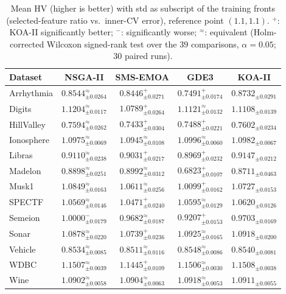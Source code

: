 
\begin{table}[!htbp]
\caption{Mean HV (higher is better) with std as subscript of the training fronts (selected-feature ratio vs.\ inner-CV error), reference point $(1.1,1.1)$. $^+$: KOA-II significantly better; $^-$: significantly worse; $^\approx$: equivalent (Holm-corrected Wilcoxon signed-rank test over the $39$ comparisons, $\alpha=0.05$; 30 paired runs).}
\label{tab:fs_hv_train}
\centering
\small
\setlength{\tabcolsep}{4pt}
\renewcommand{\arraystretch}{1.25}
\begin{tabular}{@{}lcccc@{}}
\hline
\textbf{Dataset} & \textbf{NSGA-II} & \textbf{SMS-EMOA} & \textbf{GDE3} & \textbf{KOA-II} \\
\hline
Arrhythmia & $0.8544_{\pm0.0264}^{\approx}$ & $0.8446_{\pm0.0271}^{+}$ & $0.7491_{\pm0.0174}^{+}$ & $\mathbf{0.8732}_{\pm0.0291}$ \\
Digits & $\mathbf{1.1204}_{\pm0.0117}^{\approx}$ & $1.0789_{\pm0.0264}^{+}$ & $1.1121_{\pm0.0132}^{\approx}$ & $1.1108_{\pm0.0139}$ \\
HillValley & $0.7594_{\pm0.0262}^{\approx}$ & $0.7433_{\pm0.0304}^{+}$ & $0.7488_{\pm0.0221}^{+}$ & $\mathbf{0.7602}_{\pm0.0234}$ \\
Ionosphere & $1.0975_{\pm0.0069}^{\approx}$ & $1.0945_{\pm0.0108}^{\approx}$ & $\mathbf{1.0996}_{\pm0.0060}^{\approx}$ & $1.0982_{\pm0.0067}$ \\
Libras & $0.9110_{\pm0.0238}^{\approx}$ & $0.9031_{\pm0.0217}^{+}$ & $0.8969_{\pm0.0232}^{+}$ & $\mathbf{0.9147}_{\pm0.0212}$ \\
Madelon & $0.8898_{\pm0.0251}^{\approx}$ & $\mathbf{0.8992}_{\pm0.0312}^{\approx}$ & $0.6823_{\pm0.0107}^{+}$ & $0.8711_{\pm0.0463}$ \\
Musk1 & $\mathbf{1.0849}_{\pm0.0163}^{\approx}$ & $1.0611_{\pm0.0256}^{\approx}$ & $1.0099_{\pm0.0162}^{+}$ & $1.0727_{\pm0.0153}$ \\
SPECTF & $1.0569_{\pm0.0146}^{\approx}$ & $1.0471_{\pm0.0240}^{+}$ & $1.0595_{\pm0.0129}^{\approx}$ & $\mathbf{1.0620}_{\pm0.0126}$ \\
Semeion & $\mathbf{1.0000}_{\pm0.0179}^{-}$ & $0.9682_{\pm0.0187}^{\approx}$ & $0.9207_{\pm0.0153}^{+}$ & $0.9703_{\pm0.0169}$ \\
Sonar & $1.0878_{\pm0.0220}^{\approx}$ & $1.0739_{\pm0.0236}^{+}$ & $\mathbf{1.0925}_{\pm0.0165}^{\approx}$ & $1.0918_{\pm0.0200}$ \\
Vehicle & $0.8534_{\pm0.0085}^{\approx}$ & $0.8511_{\pm0.0116}^{\approx}$ & $\mathbf{0.8548}_{\pm0.0086}^{\approx}$ & $0.8540_{\pm0.0081}$ \\
WDBC & $1.1507_{\pm0.0039}^{\approx}$ & $1.1445_{\pm0.0109}^{+}$ & $1.1506_{\pm0.0030}^{\approx}$ & $\mathbf{1.1508}_{\pm0.0038}$ \\
Wine & $1.0902_{\pm0.0058}^{\approx}$ & $1.0904_{\pm0.0063}^{\approx}$ & $\mathbf{1.0918}_{\pm0.0053}^{\approx}$ & $1.0911_{\pm0.0055}$ \\
\hline
\end{tabular}
\end{table}

